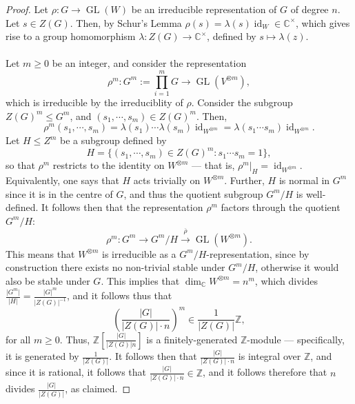 \documentclass[a4paper]{report}
\theoremstyle{definition}
\theoremstyle{remark}
\theoremstyle{proposition}
\theoremstyle{conjecture}
\theoremstyle{lemma}
\theoremstyle{corollary}
\theoremstyle{exercise}
\theoremstyle{example}
\newcommand{\C}{\mathbb{C}}
\newcommand{\on}{\operatorname}
\begin{document}
\begin{proof}
    Let $\rho : G \to \on{GL}(W)$ be an irreducible representation of 
    $G$ of degree $n$. Let $s \in Z(G)$. Then, by Schur's Lemma
    $\rho(s) = \lambda(s) \on{id}_W\in \C^\times$, which gives 
    rise to a group homomorphism $\lambda : Z(G) \to \C^\times$, defined by
    $s \mapsto \lambda(z)$.\\\\
    Let $m\geq 0$ be an integer, and consider the representation
    $$\rho^m : G^m := \prod_{i=1}^m G \longrightarrow \on{GL}(V^{\otimes m}),$$
    which is irreducible by the irreduciblity of $\rho$.
    Consider the subgroup $Z(G)^m \leq G^m$, and $(s_1,\cdots,s_m) \in Z(G)^m$.
    Then, $$\rho^m(s_1,\cdots,s_m) = \lambda(s_1)\cdots \lambda(s_m)\on{id}_{W^{\otimes m}} = \lambda(s_1\cdots s_m) \on{id}_{W^{\otimes m}}.$$
    Let $H \leq Z^m$ be a subgroup defined by 
    $$H = \lbrace (s_1,\cdots,s_m)\in Z(G)^m : s_1\cdots s_m = 1\rbrace,$$
    so that $\rho^m$ restricts to the identity on $W^{\otimes m}$ --- that is,
    $\rho^m\vert_H = \on{id}_{W^{\otimes m}}$. Equivalently, one says that 
    $H$ acts trivially on $W^{\otimes m}$. Further, $H$ is normal in 
    $G^m$ since it is in the centre of $G$, and thus the 
    quotient subgroup $G^m/H$ is well-defined.
    It follows then that the representation $\rho^m$ factors through 
    the quotient $G^m /H$:
    $$\rho^m  :G^m \longrightarrow G^m/H \stackrel{\overline{\rho}}{\longrightarrow} \on{GL}(W^{\otimes m}).$$
    This means that $W^{\otimes m}$ is irreducible as a $G^m/H$-representation,
    since by construction there exists no non-trivial stable under 
    $G^m/H$, otherwise it would also be stable under $G$.
    This implies that 
    $\dim_\C W^{\otimes m} = n^m$, which divides $\frac{\vert G^m\vert}{\vert H\vert} = \frac{\vert G\vert^m}{\vert Z(G)\vert^{-1}}$, 
    and it follows thus that 
    $$\left(\frac{\vert G\vert}{\vert Z(G)\vert \cdot n}\right)^m \in \frac{1}{\vert Z(G)\vert}\mathbb{Z},$$ for all $m\geq 0$.
    Thus, $\mathbb{Z}\left[\frac{\vert G\vert}{\vert Z(G)\vert n}\right]$ 
    is a finitely-generated $\mathbb{Z}$-module --- specifically, 
    it is generated by $\frac{1}{\vert Z(G)\vert}$. It follows then that 
    $\frac{\vert G\vert}{\vert Z(G)\vert \cdot n}$ is integral over $\mathbb{Z}$,
    and since it is rational, it follows that $\frac{\vert G\vert}{\vert Z(G)\vert\cdot n} \in \mathbb{Z}$, and it follows therefore that $n$ divides 
    $\frac{\vert G\vert}{\vert Z(G)\vert}$, as claimed.

\end{proof}
\end{document}
